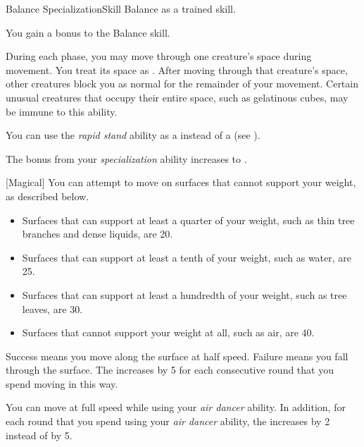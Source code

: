     \begin{feat}{Balance Specialization}{Skill}
        \featpre Balance as a trained skill.

         You gain a  bonus to the Balance skill.

         During each phase, you may move through one creature's space during movement.
        You treat its space as .
        After moving through that creature's space, other creatures block you as normal for the remainder of your movement.
        Certain unusual creatures that occupy their entire space, such as gelatinous cubes, may be immune to this ability.

         You can use the \textit{rapid stand} ability as a  instead of a  (see ).

         The bonus from your \textit{specialization} ability increases to .

        [Magical] You can attempt to move on surfaces that cannot support your weight, as described below.
        \begin{itemize}
            \item Surfaces that can support at least a quarter of your weight, such as thin tree branches and dense liquids, are  20.
            \item Surfaces that can support at least a tenth of your weight, such as water, are  25.
            \item Surfaces that can support at least a hundredth of your weight, such as tree leaves, are  30.
            \item Surfaces that cannot support your weight at all, such as air, are  40.
        \end{itemize}

        Success means you move along the surface at half speed.
        Failure means you fall through the surface.
        The  increases by 5 for each consecutive round that you spend moving in this way.

         You can move at full speed while using your \textit{air dancer} ability.
        In addition, for each round that you spend using your \textit{air dancer} ability, the  increases by 2 instead of by 5.
    \end{feat}

